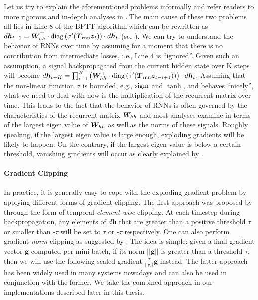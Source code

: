 Let us try to explain the aforementioned problems informally and 
refer readers to more rigorous and in-depth analyses in \cite{Bengio-trnn94,lstm97,MartensS11,pascanu13}.
The main cause of these two problems all lies in Line 8 of the BPTT
algorithm which can be rewritten as
$d\bm{h}_{t-1} = \bm{W}_{hh}^\top \cdot \text{diag}\left(\sigma'(\mbox{\boldmath{$T$}}_{\text{rnn}} \bm{z}_{t})\right) \cdot
d\bm{h}_{t}$ (see ). We can try to understand the behavior of RNNs over time by assuming
for a moment that there is no contribution from intermediate losses, i.e., Line 4
is ``ignored''. Given such an assumption, a signal backpropagated from the current hidden state over K
steps will become 
$d\bm{h}_{t-K} = \prod_{i=1}^{K} \left(\bm{W}_{hh}^\top \cdot \text{diag}\left(\sigma'(\mbox{\boldmath{$T$}}_{\text{rnn}}
\bm{z}_{t-i+1})\right)\right) \cdot
d\bm{h}_{t}$. Assuming that the non-linear function $\sigma$ is bounded, e.g.,
$\operatorname{sigm}$ and $\tanh$, and behaves ``nicely'', what we need to deal with now is
the multiplication of the recurrent matrix over time.
This leads to the fact that the behavior of RNNs is often governed by the characteristics of the recurrent matrix
$\bm{W}_{hh}$ and most analyses examine in terms of the largest eigen value of
$\bm{W}_{hh}$ as well as the norms of these signals. Roughly speaking, if the largest eigen value
is large enough, exploding gradients will be likely to happen. On the contrary,
if the largest eigen value is below a certain threshold, vanishing gradients
will occur as clearly explained by .

\paragraph{Gradient Clipping} In practice, it is generally easy to cope with the exploding gradient problem by
applying different forms of gradient clipping. The first approach was proposed by
 through the form of temporal {\it element-wise} clipping. At
each timestep during backpropagation, any elements of $d\bm{h}$ that are greater
than a positive threshold $\tau$ or smaller than -$\tau$ will be set
to $\tau$ or -$\tau$ respectively. One can also perform gradient {\it norm}
clipping as suggested by . The idea is simple: given a final
gradient vector $\bm{g}$ computed per mini-batch, if its norm
$||\bm{g}||$ is greater than a threshold
$\tau$, then we will use the following scaled gradient $\frac{\tau}{||\bm{g}||} \bm{g}$
instead. The latter approach has been widely used in many systems nowadays and
can also be used in conjunction with the former. We take the combined approach
in our implementations described later in this thesis. 

